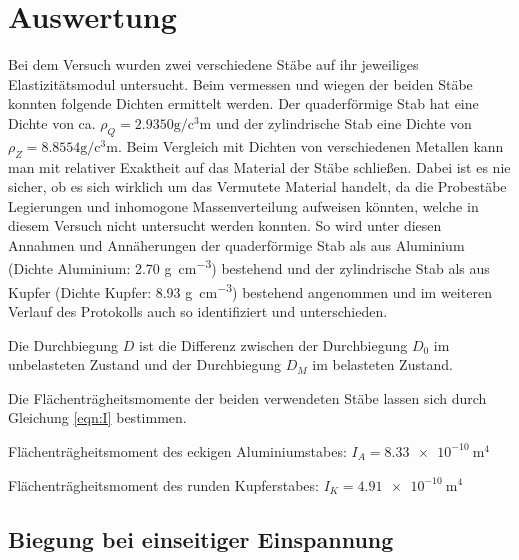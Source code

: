 \section{Auswertung}
\label{sec:Auswertung}

Bei dem Versuch wurden zwei verschiedene Stäbe auf ihr jeweiliges Elastizitätsmodul untersucht.
Beim vermessen und wiegen der beiden Stäbe konnten folgende Dichten ermittelt werden.
Der quaderförmige Stab hat eine Dichte von ca. $\rho_Q = 2.9350 \si{\gram\per\cubic\centi\meter}$
und der zylindrische Stab eine Dichte von $\rho_Z = 8.8554 \si{\gram\per\cubic\centi\meter}$.
Beim Vergleich mit Dichten von verschiedenen Metallen kann man mit relativer Exaktheit auf das Material
der Stäbe schließen. Dabei ist es nie sicher, ob es sich wirklich um das Vermutete Material handelt, 
da die Probestäbe Legierungen und inhomogone Massenverteilung aufweisen könnten,
welche in diesem Versuch nicht untersucht werden konnten. So wird unter diesen Annahmen und Annäherungen der quaderförmige Stab als aus Aluminium (Dichte Aluminium: 2.70 \si{\gram\per\cubic\centi\meter}\cite{taschenbuch_physik}) bestehend und der zylindrische Stab als aus Kupfer (Dichte Kupfer: 8.93 \si{\gram\per\cubic\centi\meter}\cite{taschenbuch_physik}) bestehend angenommen und im weiteren Verlauf des Protokolls auch so identifiziert und unterschieden.



Die Durchbiegung $D$ ist die Differenz zwischen der Durchbiegung $D_0$ im unbelasteten Zustand und der
Durchbiegung $D_M$ im belasteten Zustand.

Die Flächenträgheitsmomente der beiden verwendeten Stäbe lassen sich durch Gleichung \eqref{eqn:I} bestimmen. 


Flächenträgheitsmoment des eckigen Aluminiumstabes: $I_A = \SI{8.33e-10}{\meter\tothe{4}}$


Flächenträgheitsmoment des runden Kupferstabes: $I_K = \SI{4.91e-10}{\meter\tothe{4}} $



\subsection{Biegung bei einseitiger Einspannung}



